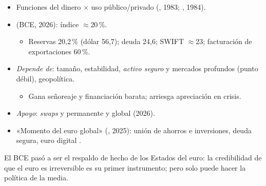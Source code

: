 \documentclass{article}
\begin{document}
\begin{columnas}
\begin{itemize}
\item Funciones del dinero $\times$ uso público/privado (, 1983; , 1984).
\item {} (BCE, 2026): índice $\approx$20\,\%.
  \begin{itemize}
  \item Reservas 20,2\,\% (dólar 56,7); deuda 24,6; SWIFT $\approx$23; facturación de exportaciones 60\,\%.
  \end{itemize}
\item \emph{Depende de}: tamaño, estabilidad, \emph{activo seguro} y mercados profundos (punto débil), geopolítica.
  \begin{itemize}
  \item Gana señoreaje y financiación barata; arriesga apreciación en crisis.
  \end{itemize}
\item \emph{Apoyo}: \emph{swaps} y  permanente y global (2026).
\item «Momento del euro global» (, 2025): unión de ahorros e inversiones, deuda segura, euro digital .
\end{itemize}

\begin{ideaclave}
El BCE pasó a ser el respaldo de hecho de los Estados del euro: la credibilidad de que el euro es irreversible es su primer instrumento; pero solo puede hacer la política de la media.
\end{ideaclave}


\end{columnas}
\end{document}

